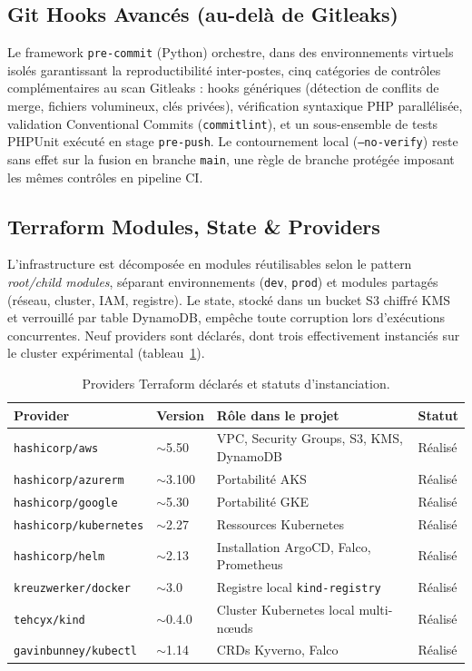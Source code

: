 \subsection{Git Hooks Avancés (au-delà de Gitleaks)}
Le framework \texttt{pre-commit} (Python) orchestre, dans des environnements virtuels isolés garantissant la reproductibilité inter-postes, cinq catégories de contrôles complémentaires au scan Gitleaks : hooks génériques (détection de conflits de merge, fichiers volumineux, clés privées), vérification syntaxique PHP parallélisée, validation Conventional Commits (\texttt{commitlint}), et un sous-ensemble de tests PHPUnit exécuté en stage \texttt{pre-push}. Le contournement local (\texttt{--no-verify}) reste sans effet sur la fusion en branche \texttt{main}, une règle de branche protégée imposant les mêmes contrôles en pipeline CI.

\subsection{Terraform Modules, State \& Providers}
L'infrastructure est décomposée en modules réutilisables selon le pattern \textit{root/child modules}, séparant environnements (\texttt{dev}, \texttt{prod}) et modules partagés (réseau, cluster, IAM, registre). Le state, stocké dans un bucket S3 chiffré KMS et verrouillé par table DynamoDB, empêche toute corruption lors d'exécutions concurrentes. Neuf providers sont déclarés, dont trois effectivement instanciés sur le cluster expérimental (tableau~\ref{tab:terraform_providers}).

\begin{table}[H]
\centering
\scriptsize
\begin{tabular}{@{}p{3cm}p{2.5cm}p{5.5cm}p{2cm}@{}}
\toprule
\textbf{Provider} & \textbf{Version} & \textbf{Rôle dans le projet} & \textbf{Statut} \\
\midrule
\texttt{hashicorp/aws} & $\sim$5.50 & VPC, Security Groups, S3, KMS, DynamoDB & Réalisé \\
\texttt{hashicorp/azurerm} & $\sim$3.100 & Portabilité AKS & Réalisé \\
\texttt{hashicorp/google} & $\sim$5.30 & Portabilité GKE & Réalisé \\
\texttt{hashicorp/kubernetes} & $\sim$2.27 & Ressources Kubernetes & Réalisé \\
\texttt{hashicorp/helm} & $\sim$2.13 & Installation ArgoCD, Falco, Prometheus & Réalisé \\
\texttt{kreuzwerker/docker} & $\sim$3.0 & Registre local \texttt{kind-registry} & Réalisé \\
\texttt{tehcyx/kind} & $\sim$0.4.0 & Cluster Kubernetes local multi-nœuds & Réalisé \\
\texttt{gavinbunney/kubectl} & $\sim$1.14 & CRDs Kyverno, Falco & Réalisé \\
\bottomrule
\end{tabular}
\caption{Providers Terraform déclarés et statuts d'instanciation.}
\label{tab:terraform_providers}
\end{table}

